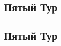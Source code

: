 \documentclass[a4paper, 11pt]{article}
\theoremstyle{break}
\begin{document}
\thispagestyle{empty}
\subsection*{Пятый Тур}



\subsection*{Пятый Тур}
\setcounter{problem}{0}
\end{document}
